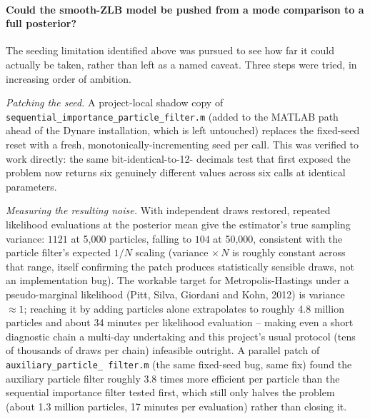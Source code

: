 \documentclass[11pt]{article}
\begin{document}
\paragraph{Could the smooth-ZLB model be pushed from a mode comparison to
a full posterior?} The seeding limitation identified above was pursued to
see how far it could actually be taken, rather than left as a named
caveat. Three steps were tried, in increasing order of ambition.

\emph{Patching the seed.} A project-local shadow copy of
\texttt{sequential\_importance\_particle\_filter.m} (added to the MATLAB
path ahead of the Dynare installation, which is left untouched) replaces
the fixed-seed reset with a fresh, monotonically-incrementing seed per
call. This was verified to work directly: the same bit-identical-to-12-
decimals test that first exposed the problem now returns six genuinely
different values across six calls at identical parameters.

\emph{Measuring the resulting noise.} With independent draws restored,
repeated likelihood evaluations at the posterior mean give the estimator's
true sampling variance: $1121$ at 5{,}000 particles, falling to $104$ at
50{,}000, consistent with the particle filter's expected $1/N$ scaling
(variance $\times\, N$ is roughly constant across that range, itself
confirming the patch produces statistically sensible draws, not an
implementation bug). The workable target for Metropolis-Hastings under a
pseudo-marginal likelihood (Pitt, Silva, Giordani and Kohn, 2012) is
variance $\approx 1$; reaching it by adding particles alone extrapolates
to roughly 4.8 million particles and about 34 minutes per likelihood
evaluation -- making even a short diagnostic chain a multi-day undertaking
and this project's usual protocol (tens of thousands of draws per chain)
infeasible outright. A parallel patch of \texttt{auxiliary\_particle\_%
filter.m} (the same fixed-seed bug, same fix) found the auxiliary particle
filter roughly 3.8 times more efficient per particle than the sequential
importance filter tested first, which still only halves the problem
(about 1.3 million particles, 17 minutes per evaluation) rather than
closing it.
\end{document}
